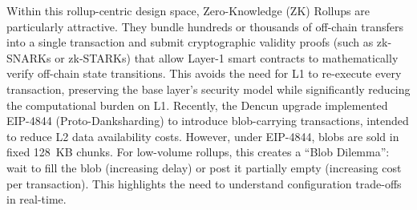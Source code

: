 Within this rollup-centric design space, Zero-Knowledge (ZK) Rollups are particularly attractive. They bundle hundreds or thousands of off-chain transfers into a single transaction and submit cryptographic validity proofs (such as zk-SNARKs or zk-STARKs) that allow Layer-1 smart contracts to mathematically verify off-chain state transitions. This avoids the need for L1 to re-execute every transaction, preserving the base layer's security model while significantly reducing the computational burden on L1. Recently, the Dencun upgrade implemented EIP-4844 (Proto-Danksharding) to introduce blob-carrying transactions, intended to reduce L2 data availability costs. However, under EIP-4844, blobs are sold in fixed 128~KB chunks. For low-volume rollups, this creates a ``Blob Dilemma'': wait to fill the blob (increasing delay) or post it partially empty (increasing cost per transaction). This highlights the need to understand configuration trade-offs in real-time.
